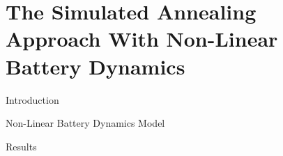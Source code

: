 \documentclass[bigger]{beamer}
\begin{document}
\section{The Simulated Annealing Approach With Non-Linear Battery Dynamics}
\label{sec:org4fec74f}
\begin{frame}[label={sec:org43194e5}]{Introduction}
\end{frame}
\begin{frame}[label={sec:orgb8380b3}]{Non-Linear Battery Dynamics Model}
\end{frame}
\begin{frame}[label={sec:orgebf0dc6}]{Results}
\end{frame}
\end{document}
